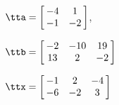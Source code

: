 {$\tta = \left[\hskip -3pt \begin{array}{cc} -4&1 \\    -1&-2 \end{array}\hskip -3pt \right] $, 

$\ttb=\left[\hskip -3pt \begin{array}{ccc} -2&-10&19\\    13&2&-2 \end{array}\hskip -3pt \right] $}
{$\ttx=\left[\hskip -3pt \begin{array}{ccc} -1&2&-4\\    -6&-2&3  \end{array}\hskip -3pt \right] $}
